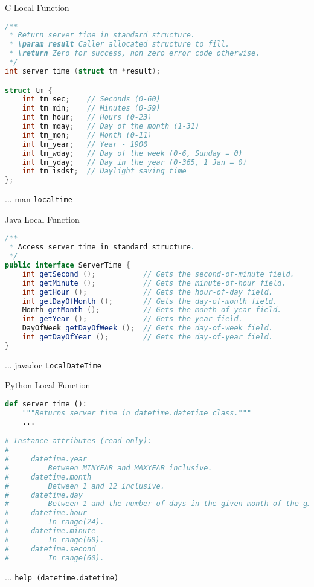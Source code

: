\begin{frame}[fragile]{C Local Function}
\begin{lstlisting}[language=c,style=mini]
/**
 * Return server time in standard structure.
 * \param result Caller allocated structure to fill.
 * \return Zero for success, non zero error code otherwise.
 */
int server_time (struct tm *result);

struct tm {
    int tm_sec;    // Seconds (0-60)
    int tm_min;    // Minutes (0-59)
    int tm_hour;   // Hours (0-23)
    int tm_mday;   // Day of the month (1-31)
    int tm_mon;    // Month (0-11)
    int tm_year;   // Year - 1900
    int tm_wday;   // Day of the week (0-6, Sunday = 0)
    int tm_yday;   // Day in the year (0-365, 1 Jan = 0)
    int tm_isdst;  // Daylight saving time
};
\end{lstlisting}
    \hfill ... man \lstinline{localtime}
\end{frame}


\begin{frame}[fragile]{Java Local Function}
\begin{lstlisting}[language=java,style=mini]
/**
 * Access server time in standard structure.
 */
public interface ServerTime {
    int getSecond ();           // Gets the second-of-minute field.
    int getMinute ();           // Gets the minute-of-hour field.
    int getHour ();             // Gets the hour-of-day field.
    int getDayOfMonth ();       // Gets the day-of-month field.
    Month getMonth ();          // Gets the month-of-year field.
    int getYear ();             // Gets the year field.
    DayOfWeek getDayOfWeek ();  // Gets the day-of-week field.
    int getDayOfYear ();        // Gets the day-of-year field.
}
\end{lstlisting}
    \hfill ... javadoc \lstinline{LocalDateTime}
\end{frame}


\begin{frame}[fragile]{Python Local Function}
\begin{lstlisting}[language=python,style=mini]
def server_time ():
    """Returns server time in datetime.datetime class."""
    ...

# Instance attributes (read-only):
#
#     datetime.year
#         Between MINYEAR and MAXYEAR inclusive.
#     datetime.month
#         Between 1 and 12 inclusive.
#     datetime.day
#         Between 1 and the number of days in the given month of the given year.
#     datetime.hour
#         In range(24).
#     datetime.minute
#         In range(60).
#     datetime.second
#         In range(60).
\end{lstlisting}
    \hfill ... \lstinline{help (datetime.datetime)}
\end{frame}


